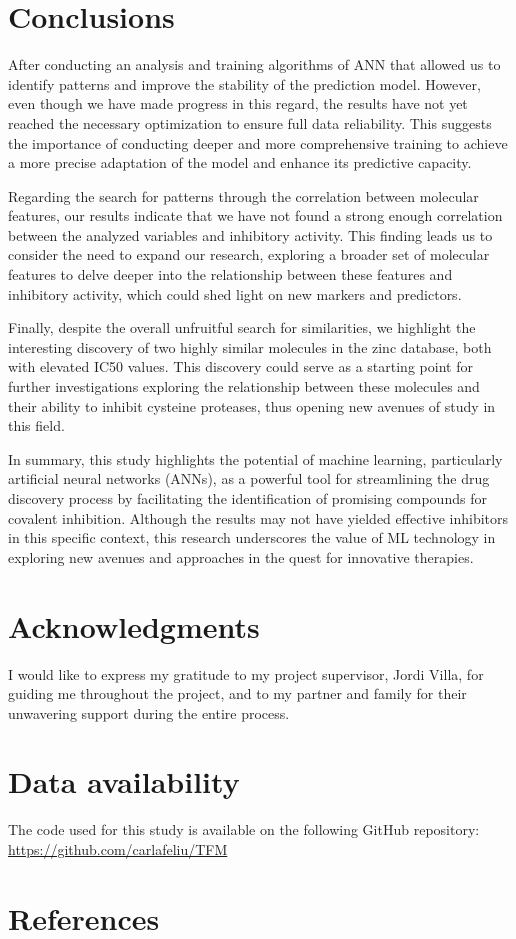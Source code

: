 \documentclass[final,times,twocolumn,article]{elsarticle}
\begin{document}
\FloatBarrier
\section{Conclusions}

After conducting an analysis and training algorithms of ANN that allowed us to identify patterns and improve the stability of the prediction model. However, even though we have made progress in this regard, the results have not yet reached the necessary optimization to ensure full data reliability. This suggests the importance of conducting deeper and more comprehensive training to achieve a more precise adaptation of the model and enhance its predictive capacity.

Regarding the search for patterns through the correlation between molecular features, our results indicate that we have not found a strong enough correlation between the analyzed variables and inhibitory activity. This finding leads us to consider the need to expand our research, exploring a broader set of molecular features to delve deeper into the relationship between these features and inhibitory activity, which could shed light on new markers and predictors.

Finally, despite the overall unfruitful search for similarities, we highlight the interesting discovery of two highly similar molecules in the zinc database, both with elevated IC50 values. This discovery could serve as a starting point for further investigations exploring the relationship between these molecules and their ability to inhibit cysteine proteases, thus opening new avenues of study in this field.

In summary, this study highlights the potential of machine learning, particularly artificial neural networks (ANNs), as a powerful tool for streamlining the drug discovery process by facilitating the identification of promising compounds for covalent inhibition. Although the results may not have yielded effective inhibitors in this specific context, this research underscores the value of ML technology in exploring new avenues and approaches in the quest for innovative therapies.

\appendix

\section{Acknowledgments}

I would like to express my gratitude to my project supervisor, Jordi Villa, for guiding me throughout the project, and to my partner and family for their unwavering support during the entire process.

\section{Data availability}

The code used for this study is available on the following GitHub repository: \href{https://github.com/carlafeliu/TFM}{https://github.com/carlafeliu/TFM}


\section{References}
 

\end{document}
